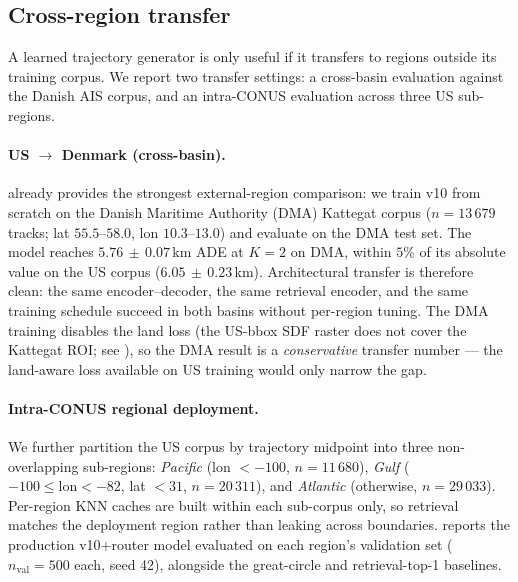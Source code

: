 \documentclass[11pt]{article}
\begin{document}
\subsection{Cross-region transfer}
\label{sec:crossregion}

A learned trajectory generator is only useful if it transfers to
regions outside its training corpus. We report two transfer settings:
a cross-basin evaluation against the Danish AIS corpus, and an
intra-CONUS evaluation across three US sub-regions.

\paragraph{US $\to$ Denmark (cross-basin).}
 already provides the strongest external-region
comparison: we train v10 from scratch on the Danish Maritime Authority
(DMA) Kattegat corpus ($n=13\,679$ tracks; lat $55.5$--$58.0$, lon
$10.3$--$13.0$) and evaluate on the DMA test set. The model reaches
$5.76\,\pm\,0.07$\,km ADE at $K{=}2$ on DMA, within $5$\% of its absolute
value on the US corpus ($6.05\,\pm\,0.23$\,km). Architectural transfer
is therefore clean: the same encoder--decoder, the same retrieval
encoder, and the same training schedule succeed in both basins without
per-region tuning. The DMA training disables the land loss (the
US-bbox SDF raster does not cover the Kattegat ROI;
see ), so the DMA result is a \emph{conservative}
transfer number --- the land-aware loss available on US training would
only narrow the gap.

\paragraph{Intra-CONUS regional deployment.} We further partition the
US corpus by trajectory midpoint into three non-overlapping
sub-regions: \emph{Pacific} (lon $<-100$, $n=11\,680$), \emph{Gulf}
($-100 \le \mathrm{lon} < -82$, lat $<31$, $n=20\,311$), and
\emph{Atlantic} (otherwise, $n=29\,033$). Per-region KNN caches are
built within each sub-corpus only, so retrieval matches the deployment
region rather than leaking across boundaries.
 reports the production v10+router model evaluated
on each region's validation set ($n_{\text{val}}=500$ each, seed 42),
alongside the great-circle and retrieval-top-1 baselines.
\end{document}
